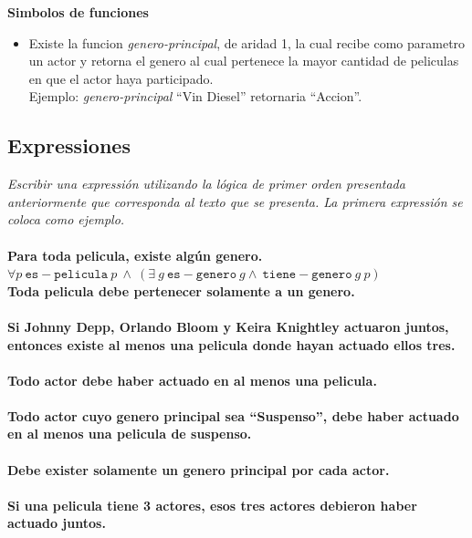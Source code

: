 \documentclass{article}
\begin{document}
{\bf Simbolos de funciones}
\begin{itemize}
        \item{Existe la funcion \emph{genero-principal}, de aridad 1, la cual recibe como
                parametro un actor y retorna el genero al cual pertenece la mayor cantidad
                de peliculas en que el actor haya participado.\\Ejemplo:
                \emph{genero-principal} ``Vin Diesel''} retornaria ``Accion''.
\end{itemize}

\subsection*{Expressiones}
\emph{Escribir una expressi\'on utilizando la l\'ogica de primer orden
presentada anteriormente que corresponda al texto que se presenta. La
primera expressi\'on se coloca como ejemplo.}
\\\vspace{0.1cm}\\{\bf Para toda pelicula, existe alg\'un genero.}\\
$\forall p\ \mathtt{es-pelicula}\ p\ \wedge\ (\exists\ g\ \mathtt{es-genero}\ g\wedge\ \mathtt{tiene-genero}\ g\ p)$
\vspace{20cm}
\\{\bf Toda pelicula debe pertenecer solamente a un genero.}
\\\vspace{3cm}
\\{\bf Si Johnny Depp, Orlando Bloom y Keira Knightley actuaron juntos,
        entonces existe al menos una pelicula donde hayan actuado ellos tres.}
\\\vspace{3cm}
\\{\bf Todo actor debe haber actuado en al menos una pelicula.}
\\\vspace{3cm}
\\{\bf Todo actor cuyo genero principal sea ``Suspenso'', debe haber
        actuado en al menos una pelicula de suspenso.}
\\\vspace{3cm}
\\{\bf Debe exister solamente un genero principal por cada actor.}
\\\vspace{3cm}
\\{\bf Si una pelicula tiene 3 actores, esos tres actores
        debieron haber actuado juntos.}
\end{document}
